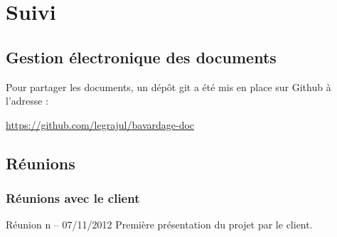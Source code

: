 \documentclass[a4paper,11pt,french]{article}
\begin{document}
\begin{landscape}
\end{landscape}


\section{Suivi}
\subsection{Gestion électronique des documents}
Pour partager les documents, un dépôt git a été mis en place sur Github à l'adresse : 

\href{url: https://github.com/legrajul/bavardage-doc}{https://github.com/legrajul/bavardage-doc}

\subsection{Réunions}
\subsubsection{Réunions avec le client}
\begin{paragraph}{Réunion n -- 07/11/2012}
Première présentation du projet par le client.
\end{paragraph}
\end{document}
